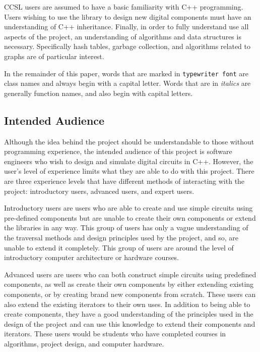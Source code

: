 \documentclass{article}
\newcommand{\ClassName}[1]{\texttt{#1}}
\newcommand{\FunctionName}[1]{\textit{#1}}
\begin{document}
CCSL users are assumed to have a basic familiarity with C++ programming. Users wishing to use the library to design new digital components must have an understanding of C++ inheritance\cite{bjarne}. Finally, in order to fully understand use all aspects of the project, an understanding of algorithms and data structures is necessary. Specifically hash tables, garbage collection, and algorithms related to graphs are of particular interest.

In the remainder of this paper, words that are marked in \ClassName{typewriter font} are class names and always begin with a capital letter. Words that are in \FunctionName{italics} are generally function names, and also begin with capital letters.

\subsection{Intended Audience}

Although the idea behind the project should be understandable to those without programming experience, the intended audience of this project is software engineers who wish to design and simulate digital circuits in C++. However, the user's level of experience limits what they are able to do with this project. There are three experience levels that have different methods of interacting with the project: introductory users, advanced users, and expert users.

Introductory users are users who are able to create and use simple circuits using pre-defined components but are unable to create their own components or extend the libraries in any way. This group of users has only a vague understanding of the traversal methods and design principles used by the project, and so, are unable to extend it completely. This group of users are around the level of introductory computer architecture or hardware courses.

Advanced users are users who can both construct simple circuits using predefined components, as well as create their own components by either extending existing components, or by creating brand new components from scratch. These users can also extend the existing iterators to their own uses. In addition to being able to create components, they have a good understanding of the principles used in the design of the project and can use this knowledge to extend their components and iterators. These users would be students who have completed courses in algorithms, project design, and computer hardware.
\end{document}
